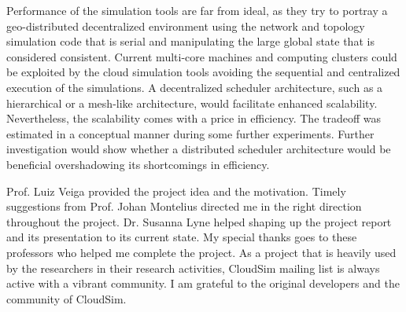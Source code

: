 \documentclass[times, 10pt,twocolumn]{article}
\begin{document}
Performance of the simulation tools are far from ideal, as they try to portray a geo-distributed decentralized environment using the network and topology simulation code that is serial and manipulating the large global state that is  considered consistent. Current multi-core machines and computing clusters could be exploited by the cloud simulation tools avoiding the sequential and centralized execution of the simulations. A decentralized scheduler architecture, such as a hierarchical or a mesh-like architecture, would facilitate enhanced scalability. Nevertheless, the scalability comes with a price in efficiency. The tradeoff was estimated in a conceptual manner during some further experiments. Further investigation would show whether a distributed scheduler architecture would be beneficial overshadowing its shortcomings in efficiency.

Prof. Luiz Veiga provided the project idea and the motivation. Timely suggestions from Prof. Johan Montelius directed me in the right direction throughout the project. Dr. Susanna Lyne helped shaping up the project report and its presentation to its current state. My special thanks goes to these professors who helped me complete the project. As a project that is heavily used by the researchers in their research activities, CloudSim mailing list is always active with a vibrant community. I am grateful to the original developers and the community of CloudSim.
\end{document}
